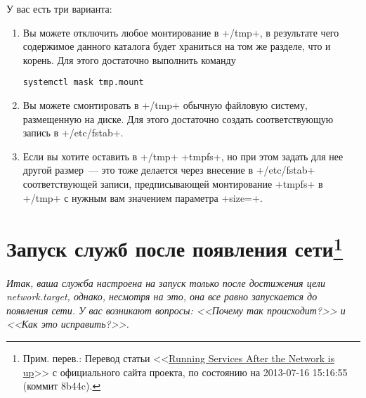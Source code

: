 \documentclass[10pt,oneside,a4paper]{article}
\newcommand{\sfnote}[1]{\texorpdfstring{\protect\footnote%
	{Прим. перев.: #1}}{}}
\newcommand\yousaywtf[1]{\emph{#1}}
\newcommand\yousaywtfsk[1]{\yousaywtf{#1}\medskip\par}
\begin{document}
У вас есть три варианта:
\begin{enumerate}
	\item Вы можете отключить любое монтирование в +/tmp+, в результате чего
		содержимое данного каталога будет храниться на том же разделе, что
		и корень. Для этого достаточно выполнить команду
\begin{Verbatim}
systemctl mask tmp.mount
\end{Verbatim}
	\item Вы можете смонтировать в +/tmp+ обычную файловую систему,
		размещенную на диске. Для этого достаточно создать
		соответствующую запись в +/etc/fstab+.
	\item Если вы хотите оставить в +/tmp+ +tmpfs+, но при этом задать для
		нее другой размер~--- это тоже делается через внесение в
		+/etc/fstab+ соответствующей записи, предписывающей монтирование
		+tmpfs+ в +/tmp+ с нужным вам значением параметра +size=+.
\end{enumerate}

\section{Запуск служб после появления сети\sfnote{Перевод статьи
<<\href{http://www.freedesktop.org/wiki/Software/systemd/NetworkTarget}{Running
Services After the Network is up}>> с официального сайта проекта, по состоянию
на 2013-07-16 15:16:55 (коммит 8b44c).}}
\label{sec:networktarget}

\yousaywtfsk{Итак, ваша служба настроена на запуск только после достижения цели
network.target, однако, несмотря на это, она все равно запускается до появления
сети. У вас возникают вопросы: <<Почему так происходит?>> и <<Как это
исправить?>>.}
\end{document}
